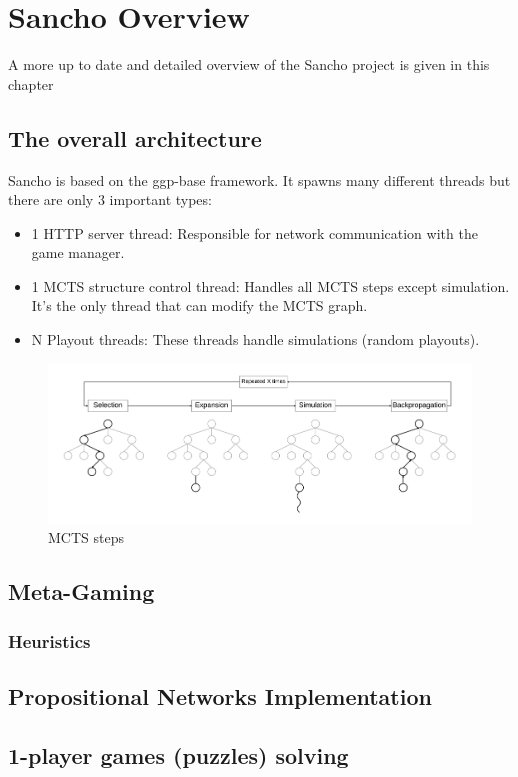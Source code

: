 
\chapter{Sancho Overview}
\label{chapter:sancho_overview}

A more up to date and detailed overview of the Sancho project is given in this chapter

\section{The overall architecture}

Sancho is based on the ggp-base framework.
It spawns many different threads but there are only 3 important types:
\begin{itemize}
	\item 1 HTTP server thread: Responsible for network communication with the game manager.
	\item 1 MCTS structure control thread: Handles all MCTS steps except simulation. It's the only thread that can modify the MCTS graph.
	\item N Playout threads: These threads handle simulations (random playouts).    
\end{itemize}
	
	
\begin{figure}[h]
	\centering
	\includegraphics[width=\textwidth]{images/MCTS.pdf}
	\caption{MCTS steps}
	\label{fig:mcts steps}
\end{figure}


\section{Meta-Gaming}

\subsection{Heuristics}

\section{Propositional Networks Implementation}

\section{1-player games (puzzles) solving}



